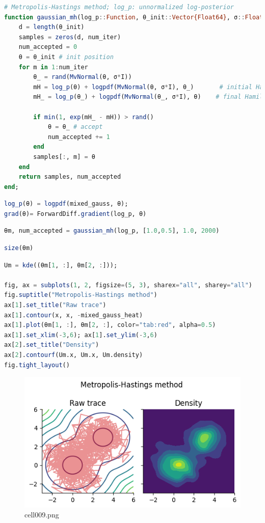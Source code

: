\begin{lstlisting}[language=julia]
# Metropolis-Hastings method; log_p: unnormalized log-posterior
function gaussian_mh(log_p::Function, θ_init::Vector{Float64}, σ::Float64, num_iter::Int)
    d = length(θ_init)
    samples = zeros(d, num_iter)
    num_accepted = 0
    θ = θ_init # init position
    for m in 1:num_iter
        θ_ = rand(MvNormal(θ, σ*I))
        mH = log_p(θ) + logpdf(MvNormal(θ, σ*I), θ_)       # initial Hamiltonian
        mH_ = log_p(θ_) + logpdf(MvNormal(θ_, σ*I), θ)    # final Hamiltonian
        
        if min(1, exp(mH_ - mH)) > rand()
            θ = θ_ # accept
            num_accepted += 1
        end
        samples[:, m] = θ
    end
    return samples, num_accepted
end;
\end{lstlisting}
\begin{lstlisting}[language=julia]
log_p(θ) = logpdf(mixed_gauss, θ);
grad(θ)= ForwardDiff.gradient(log_p, θ)
\end{lstlisting}
\begin{lstlisting}[language=julia]
θm, num_accepted = gaussian_mh(log_p, [1.0,0.5], 1.0, 2000)
\end{lstlisting}
\begin{lstlisting}[language=julia]
size(θm)
\end{lstlisting}
\begin{lstlisting}[language=julia]
Um = kde((θm[1, :], θm[2, :]));

fig, ax = subplots(1, 2, figsize=(5, 3), sharex="all", sharey="all")
fig.suptitle("Metropolis-Hastings method")
ax[1].set_title("Raw trace")
ax[1].contour(x, x, -mixed_gauss_heat)
ax[1].plot(θm[1, :], θm[2, :], color="tab:red", alpha=0.5)
ax[1].set_xlim(-3,6); ax[1].set_ylim(-3,6)
ax[2].set_title("Density")
ax[2].contourf(Um.x, Um.x, Um.density)
fig.tight_layout()
\end{lstlisting}
\begin{figure}[ht]
	\centering
	\includegraphics[scale=0.8, max width=\linewidth]{./fig/bayesian-brain/mcmc/cell009.png}
	\caption{cell009.png}
	\label{cell009.png}
\end{figure}
